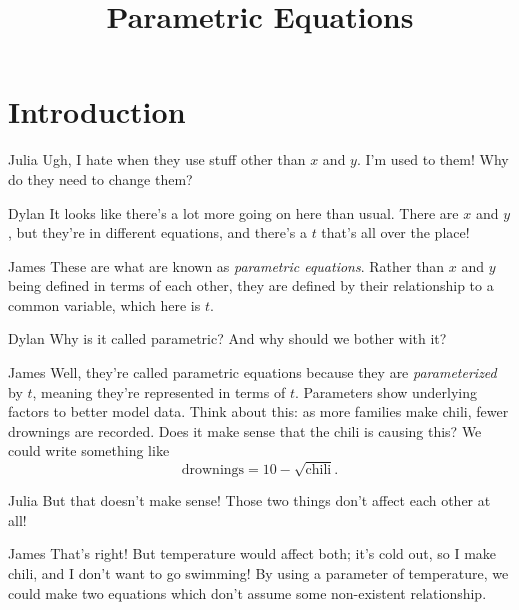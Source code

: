 \documentclass{ximera}
\title{Parametric Equations}
\begin{document}
\maketitle
\section{Introduction}
\begin{dialogue}
\item[Julia] Ugh, I hate when they use stuff other than $x$ and $y$. I'm used to them! Why do they need to change them?
\item[Dylan] It looks like there's a lot more going on here than usual. There are $x$ and $y$, but they're in different equations, and there's a $t$ that's all over the place!
\item[James] These are what are known as \textit{parametric equations}. Rather than $x$ and $y$ being defined in terms of each other, they are defined by their relationship to a common variable, which here is $t$.
\item[Dylan] Why is it called parametric? And why should we bother with it?
\item[James] Well, they're called parametric equations because they are \textit{parameterized} by $t$, meaning they're represented in terms of $t$. Parameters show underlying factors to better model data. Think about this: as more families make chili, fewer drownings are recorded. Does it make sense that the chili is causing this? We could write something like $$\text{drownings} = 10 - \sqrt{\text{chili}}\text{.}$$
\item[Julia] But that doesn't make sense! Those two things don't affect each other at all!
\item[James] That's right! But temperature would affect both; it's cold out, so I make chili, and I don't want to go swimming! By using a parameter of temperature, we could make two equations which don't assume some non-existent relationship.
\end{dialogue}
\end{document}
